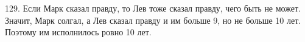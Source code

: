 129. Если Марк сказал правду, то Лев тоже сказал правду, чего быть не может. Значит, Марк солгал, а Лев сказал правду и им больше 9, но не больше 10 лет. Поэтому им исполнилось ровно 10 лет.\\
